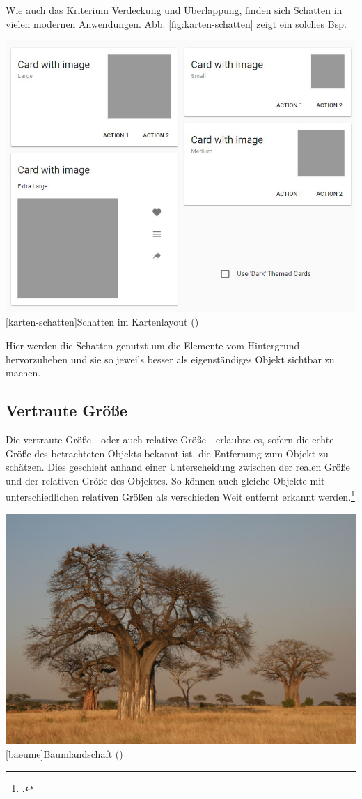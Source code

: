 Wie auch das Kriterium Verdeckung und Überlappung, finden sich Schatten in vielen modernen Anwendungen. Abb. \ref{fig:karten-schatten} zeigt ein solches Bsp.

\vspace{1em}
\begin{minipage}{\linewidth}
	\centering
	\includegraphics[width=0.7\linewidth]{images/karten_schatten.jpg}
	[karten-schatten]{Schatten im Kartenlayout (\cite{goo17})}
	\label{fig:karten-schatten}
\end{minipage}
\vspace{1em}

Hier werden die Schatten genutzt um die Elemente vom Hintergrund hervorzuheben und sie so jeweils besser als eigenständiges Objekt sichtbar zu machen.

\subsection{Vertraute Größe}
Die vertraute Größe - oder auch relative Größe - erlaubte es, sofern die echte Größe des betrachteten Objekts bekannt ist, die Entfernung zum Objekt zu schätzen. Dies geschieht anhand einer Unterscheidung zwischen der realen Größe und der relativen Größe des Objektes. So können auch gleiche Objekte mit unterschiedlichen relativen Größen als verschieden Weit entfernt erkannt werden.\footcite[Vgl.][S.43]{Ass16}

\vspace{1em}
\begin{minipage}{\linewidth}
	\centering
	\includegraphics[width=0.7\linewidth]{images/baeume.jpg}
	[baeume]{Baumlandschaft (\cite{yokyXX})}
	\label{fig:baeume}
\end{minipage}
\vspace{1em}

